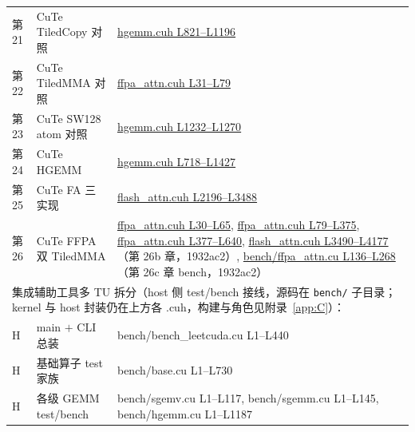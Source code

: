 \begin{longtable}{llp{7.2cm}}
第21 & CuTe TiledCopy 对照 & \href{https://github.com/xlite-dev/LeetCUDA/blob/6cd32deca683d6c4aae2011988c9f4a35bc5f528/kernels/interview/hgemm.cuh#L821-L1196}{hgemm.cuh L821--L1196} \\
第22 & CuTe TiledMMA 对照 & \href{https://github.com/xlite-dev/LeetCUDA/blob/6cd32deca683d6c4aae2011988c9f4a35bc5f528/kernels/interview/ffpa_attn.cuh#L31-L79}{ffpa\_attn.cuh L31--L79} \\
第23 & CuTe SW128 atom 对照 & \href{https://github.com/xlite-dev/LeetCUDA/blob/6cd32deca683d6c4aae2011988c9f4a35bc5f528/kernels/interview/hgemm.cuh#L1232-L1270}{hgemm.cuh L1232--L1270} \\
第24 & CuTe HGEMM & \href{https://github.com/xlite-dev/LeetCUDA/blob/6cd32deca683d6c4aae2011988c9f4a35bc5f528/kernels/interview/hgemm.cuh#L718-L1427}{hgemm.cuh L718--L1427} \\
第25 & CuTe FA 三实现 & \href{https://github.com/xlite-dev/LeetCUDA/blob/6cd32deca683d6c4aae2011988c9f4a35bc5f528/kernels/interview/flash_attn.cuh#L2196-L3488}{flash\_attn.cuh L2196--L3488} \\
第26 & CuTe FFPA 双 TiledMMA & \href{https://github.com/xlite-dev/LeetCUDA/blob/6cd32deca683d6c4aae2011988c9f4a35bc5f528/kernels/interview/ffpa_attn.cuh#L30-L65}{ffpa\_attn.cuh L30--L65}, \href{https://github.com/xlite-dev/LeetCUDA/blob/6cd32deca683d6c4aae2011988c9f4a35bc5f528/kernels/interview/ffpa_attn.cuh#L79-L375}{ffpa\_attn.cuh L79--L375}, \href{https://github.com/xlite-dev/LeetCUDA/blob/6cd32deca683d6c4aae2011988c9f4a35bc5f528/kernels/interview/ffpa_attn.cuh#L377-L640}{ffpa\_attn.cuh L377--L640}, \href{https://github.com/xlite-dev/LeetCUDA/blob/1932ac2972a71abdde7d9a36a3687485f2a7944b/kernels/interview/flash_attn.cuh#L3490-L4177}{flash\_attn.cuh L3490--L4177}（第 26b 章，1932ac2）, \href{https://github.com/xlite-dev/LeetCUDA/blob/1932ac2972a71abdde7d9a36a3687485f2a7944b/kernels/interview/bench/ffpa_attn.cu#L136-L268}{bench/ffpa\_attn.cu L136--L268}（第 26c 章 bench，1932ac2） \\
\multicolumn{3}{l}{\footnotesize 集成辅助工具多 TU 拆分（host 侧 test/bench 接线，源码在 \texttt{bench/} 子目录；kernel 与 host 封装仍在上方各 .cuh，构建与角色见附录~\ref{app:C}）：} \\
H & main $+$ CLI 总装 & bench/bench\_leetcuda.cu L1--L440 \\
H & 基础算子 test 家族 & bench/base.cu L1--L730 \\
H & 各级 GEMM test/bench & bench/sgemv.cu L1--L117, bench/sgemm.cu L1--L145, bench/hgemm.cu L1--L1187 \\

\end{longtable}
